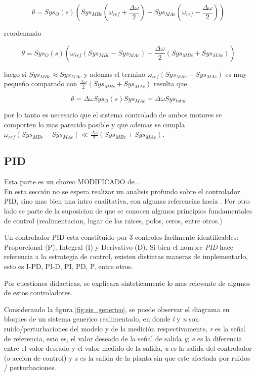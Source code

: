 \documentclass[10pt,conference,a4paper,onecolumn]{article}%
\begin{document}
\begin{equation}
\theta=Sys_O(s)\left(Sys_{MBc}(\omega_{ref}+\frac{\Delta \omega}{2}) - Sys_{MAc} (\omega_{ref}-\frac{\Delta \omega}{2}) \right)
\end{equation}

reordenando

\begin{equation}
\theta=Sys_O(s)\left(\omega_{ref} (Sys_{MBc}-Sys_{MAc})+  \frac{\Delta \omega}{2}( Sys_{MBc}+Sys_{MAc})  \right)
\end{equation}

luego si $Sys_{MBc} \approx Sys_{MAc}$ y ademas el termino $\omega_{ref} (Sys_{MBc}-Sys_{MAc})$ es muy pequeño comparado con $ \frac{\Delta \omega}{2}( Sys_{MBc}+Sys_{MAc}) $ resulta que

\begin{equation}
\theta=\Delta \omega Sys_O(s)Sys_{MAc}= \Delta \omega Sys_{total}
\end{equation}

por lo tanto es necesario que el sistema controlado de ambos motores se comporten lo mas parecido posible y que ademas se cumpla $\omega_{ref} (Sys_{MBc}-Sys_{MAc}) \ll  \frac{\Delta \omega}{2}( Sys_{MBc}+Sys_{MAc}) $.




\subsection{PID}
 Esta parte es un choreo MODIFICADO de \cite[pág. 25]{biblia_PID}.\\

En esta sección no se espera realizar un analisis profundo sobre el controlador PID, sino mas bien una intro cualitativa, con algunas referencias hacia \cite{biblia_PID}. Por otro lado se parte de la suposicion de que se conocen algunos principios fundamentales de control (realimentacion, lugar de las raices, polos, ceros, entre otros.)

Un controlador PID esta constituido por 3 controles facilmente identificables: Proporcional (P), Integral (I) y Derivativo (D). Si bien el nombre \textit{PID} hace referencia a la estrategia de control, existen distintas maneras de implementarlo, esto es I-PD, PI-D, PI, PD, P, entre otros. 

Por cuestiones didacticas, se explicara sinteticamente lo mas relevante de algunos de estos controladores.%


Considerando la figura \ref{fig:sis_generico}, se puede observar el diagrama en bloques de un sistema generico realimentado, en donde \textit{l} y \textit{n} son ruido/perturbaciones del modelo y de la medición respectivamente,   \textit{r} es la señal de referencia, esto es, el valor deseado de la señal de salida \textit{y}; \textit{e} es la diferencia entre el valor deseado y el valor medido de la salida,    \textit{u} es la salida del controlador (o accion de control) y  \textit{x} es la salida de la planta sin que este afectada por ruidos / perturbaciones.
\end{document}
